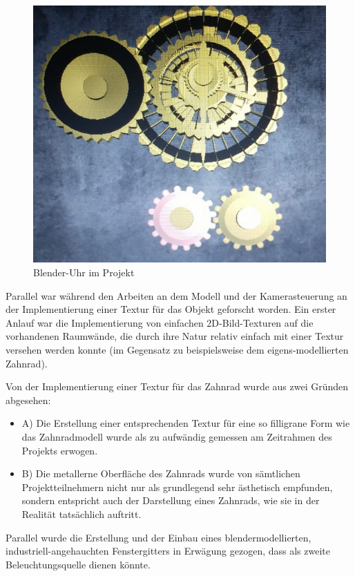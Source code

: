\documentclass{article}
\begin{document}
\begin{figure}[h!]
\centering
\includegraphics[scale=0.8]{finalClock.png}
\caption{Blender-Uhr im Projekt}
\label{fig:finalClock}
\end{figure}

Parallel war während den Arbeiten an dem Modell und der Kamerasteuerung an der Implementierung einer Textur für das Objekt geforscht worden. 
Ein erster Anlauf war die Implementierung von einfachen 2D-Bild-Texturen auf die vorhandenen Raumwände, die durch ihre Natur relativ einfach mit einer Textur versehen werden konnte (im Gegensatz zu beispielsweise dem eigens-modellierten Zahnrad). 

Von der Implementierung einer Textur für das Zahnrad wurde aus zwei Gründen abgesehen: 

\begin{itemize}
    \item A) Die Erstellung einer entsprechenden Textur für eine so filligrane Form wie das Zahnradmodell wurde als zu aufwändig gemessen am Zeitrahmen des Projekts erwogen. 
    \item B) Die metallerne Oberfläche des Zahnrads wurde von sämtlichen Projektteilnehmern nicht nur als grundlegend sehr ästhetisch empfunden, sondern entspricht auch der Darstellung eines Zahnrads, wie sie in der Realität tatsächlich auftritt. 
\end{itemize}

Parallel wurde die Erstellung und der Einbau eines blendermodellierten, industriell-angehauchten Fenstergitters in Erwägung gezogen, dass als zweite Beleuchtungsquelle dienen könnte. 
\end{document}
